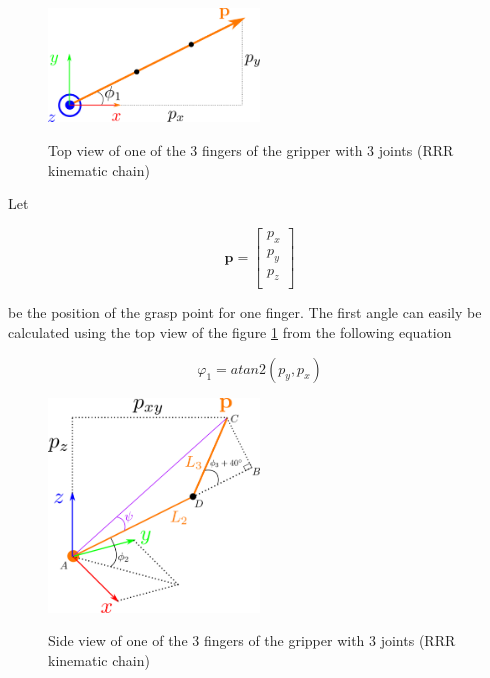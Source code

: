 \begin{center}
\begin{figure}[H]
\centering
\includegraphics[width=0.5\textwidth]{images/grasper-rrr-top.png}\\
\caption{Top view of one of the 3 fingers of the gripper with 3 joints (RRR kinematic chain)}
\label{grasper-rrr-top}
\end{figure}
\end{center}

Let

\[
\mathbf{p} = \begin{bmatrix} p_x \\ p_y \\ p_z \\ \end{bmatrix}
\]

be the position of the grasp point for one finger. The first angle can easily be calculated using the top view of the figure \ref{grasper-rrr-top} from the following equation

\begin{equation}
φ_1 = atan2 \left( p_y, p_x \right)
\end{equation}

\begin{center}
\begin{figure}[H]
\centering
\includegraphics[width=0.5\textwidth]{images/grasper-rrr-side.png}\\
\caption{Side view of one of the 3 fingers of the gripper with 3 joints (RRR kinematic chain)}
\label{grasper-rrr-side}
\end{figure}
\end{center}


